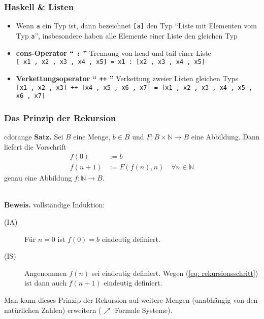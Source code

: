 \documentclass[aspectratio=1610,onlymath, ngerman, handout]{beamer}
\renewcommand{\emph}[1]{\textbf{#1}}
\begin{document}
    \begin{frame}\frametitle{Haskell \& Listen}
        \begin{itemize}
            \item Wenn \texttt{a} ein Typ ist, dann bezeichnet \texttt{[a]} den Typ ``Liste mit Elementen vom Typ \texttt{a}'', insbesondere
            haben alle Elemente einer Liste den gleichen Typ
            \bigskip \pause
            \item \emph{cons-Operator `` \texttt{:} ''} \qquad Trennung von head und tail einer Liste \\
            \texttt{[ x1 , x2 , x3 , x4 , x5] = x1 : [x2 , x3 , x4 , x5]}
            \bigskip \pause
            \item \emph{Verkettungsoperator `` \texttt{++} ''} \qquad Verkettung zweier Listen gleichen Typs \\
            \texttt{[x1 , x2 , x3] ++ [x4 , x5 , x6 , x7] = [x1 , x2 , x3 , x4 , x5 , x6 , x7]}
        \end{itemize}
    \end{frame}

    \begin{frame}\frametitle{Das Prinzip der Rekursion}
        \begin{doodle}{cdorange}
            \emph{Satz.}
            Sei $B$ eine Menge, $b \in B$ und $F \colon B \times \mathbb{N} \to B$ eine Abbildung. Dann liefert die Vorschrift
            \begin{subequations}
                \begin{align}
                    f(0) &:= b \\
                    f(n+1) &:= F(f(n),n) \quad \forall n \in \mathbb{N} \label{eq: rekursionsschritt}
                \end{align}
            \end{subequations}
            genau eine Abbildung $f : \mathbb{N} \to B$.
        \end{doodle} \\
        \bigskip
        \pause
        \emph{Beweis.} \qquad vollständige Induktion:
        \begin{description}
            \item[(IA)] Für $n=0$ ist $f(0) = b$ eindeutig definiert.
            \item[(IS)] Angenommen $f(n)$ sei eindeutig definiert. Wegen (\ref{eq: rekursionsschritt}) ist dann auch $f(n+1)$ eindeutig definiert.
        \end{description}
        
        \bigskip
        
        Man kann dieses Prinzip der Rekursion auf weitere Mengen (unabhängig von den natürlichen Zahlen) erweitern ($\nearrow$ Formale Systeme).
    \end{frame}
\end{document}
